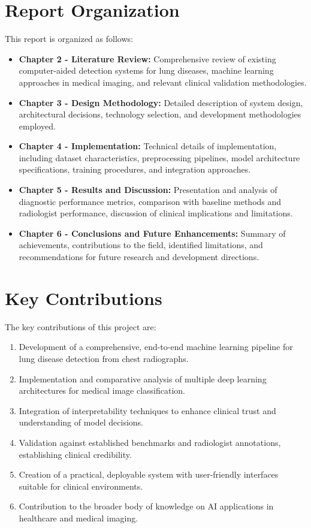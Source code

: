 {\section{Report Organization}

This report is organized as follows:

\begin{itemize}
    \item \textbf{Chapter 2 - Literature Review:} Comprehensive review of existing computer-aided detection systems for lung diseases, machine learning approaches in medical imaging, and relevant clinical validation methodologies.
    \item \textbf{Chapter 3 - Design Methodology:} Detailed description of system design, architectural decisions, technology selection, and development methodologies employed.
    \item \textbf{Chapter 4 - Implementation:} Technical details of implementation, including dataset characteristics, preprocessing pipelines, model architecture specifications, training procedures, and integration approaches.
    \item \textbf{Chapter 5 - Results and Discussion:} Presentation and analysis of diagnostic performance metrics, comparison with baseline methods and radiologist performance, discussion of clinical implications and limitations.
    \item \textbf{Chapter 6 - Conclusions and Future Enhancements:} Summary of achievements, contributions to the field, identified limitations, and recommendations for future research and development directions.
\end{itemize}

\section{Key Contributions}

The key contributions of this project are:

\begin{enumerate}
    \item Development of a comprehensive, end-to-end machine learning pipeline for lung disease detection from chest radiographs.
    \item Implementation and comparative analysis of multiple deep learning architectures for medical image classification.
    \item Integration of interpretability techniques to enhance clinical trust and understanding of model decisions.
    \item Validation against established benchmarks and radiologist annotations, establishing clinical credibility.
    \item Creation of a practical, deployable system with user-friendly interfaces suitable for clinical environments.
    \item Contribution to the broader body of knowledge on AI applications in healthcare and medical imaging.
\end{enumerate}

}
